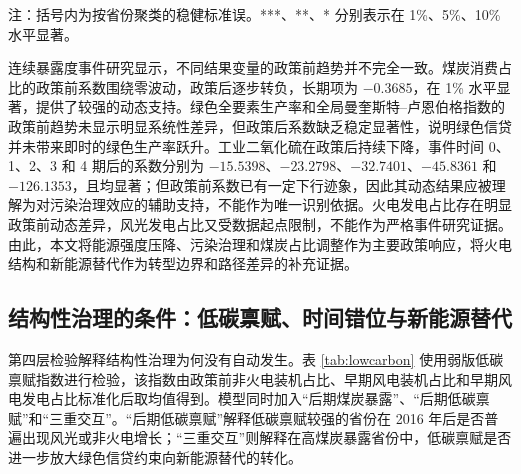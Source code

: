 \documentclass[UTF8,12pt]{ctexart}
\begin{document}
\begin{table}[htbp]
    \centering
    \caption{从约束性治理到结构性治理：煤炭占比、碳排放与火电结构}
    \label{tab:structure}
    \begin{flushleft}
    \footnotesize 注：括号内为按省份聚类的稳健标准误。***、**、* 分别表示在 1\%、5\%、10\% 水平显著。
    \end{flushleft}
\end{table}

连续暴露度事件研究显示，不同结果变量的政策前趋势并不完全一致。煤炭消费占比的政策前系数围绕零波动，政策后逐步转负，长期项为 $-0.3685$，在 1\% 水平显著，提供了较强的动态支持。绿色全要素生产率和全局曼奎斯特--卢恩伯格指数的政策前趋势未显示明显系统性差异，但政策后系数缺乏稳定显著性，说明绿色信贷并未带来即时的绿色生产率跃升。工业二氧化硫在政策后持续下降，事件时间 0、1、2、3 和 4 期后的系数分别为 $-15.5398$、$-23.2798$、$-32.7401$、$-45.8361$ 和 $-126.1353$，且均显著；但政策前系数已有一定下行迹象，因此其动态结果应被理解为对污染治理效应的辅助支持，不能作为唯一识别依据。火电发电占比存在明显政策前动态差异，风光发电占比又受数据起点限制，不能作为严格事件研究证据。由此，本文将能源强度压降、污染治理和煤炭占比调整作为主要政策响应，将火电结构和新能源替代作为转型边界和路径差异的补充证据。

\subsection{结构性治理的条件：低碳禀赋、时间错位与新能源替代}

第四层检验解释结构性治理为何没有自动发生。表 \ref{tab:lowcarbon} 使用弱版低碳禀赋指数进行检验，该指数由政策前非火电装机占比、早期风电装机占比和早期风电发电占比标准化后取均值得到。模型同时加入“后期煤炭暴露”、“后期低碳禀赋”和“三重交互”。“后期低碳禀赋”解释低碳禀赋较强的省份在 2016 年后是否普遍出现风光或非火电增长；“三重交互”则解释在高煤炭暴露省份中，低碳禀赋是否进一步放大绿色信贷约束向新能源替代的转化。
\end{document}
